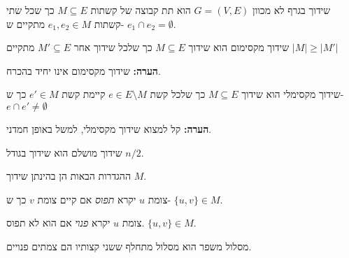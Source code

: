 \begin{definition}[שידוך]
שידוך בגרף לא מכוון
$G = (V, E)$
הוא תת קבוצה של קשתות 
$M \subseteq E$
כך שכל שתי קשתות
$e_1, e_2 \in M$
מתקיים ש-
$e_1 \cap e_2 = \emptyset$.
\end{definition}

\begin{definition}
שידוך מקסימום הוא שידוך 
$M \subseteq E$
כך שלכל שידוך אחר
$M' \subseteq E$
מתקיים
$|M| \geq |M'|$
\end{definition}

\textbf{הערה:}
שידוך מקסימום אינו יחיד בהכרח.

\begin{definition}
שידוך מקסימלי הוא שידוך 
$M \subseteq E$
כך שלכל קשת 
$e \in E \setminus M$
קיימת קשת 
$e' \in M$
כך ש-
$e \cap e' \neq \emptyset$
\end{definition}

\textbf{הערה:}
קל למצוא שידוך מקסימלי, למשל באופן חמדני.

\begin{definition}
שידוך מושלם הוא שידוך בגודל 
$n/2$.
\end{definition}

ההגדרות הבאות הן בהינתן שידוך $M$.
\begin{definition}
צומת $u$ יקרא
\emph{תפוס}
אם קיים צומת $v$ כך ש-
$\{u, v\} \in M$.
\end{definition}

\begin{definition}
צומת $u$ יקרא
\emph{פנוי}
אם הוא לא תפוס.
$\{u, v\} \in M$.
\end{definition}

\begin{definition}[מסלול מתחלף]
מסלול (פשוט) 
$(v_1, \ldots, v_l)$
יקרא
\emph{מתחלף}
אם לכל 
$1 \leq i < l$
מתקיים ש-
$|\{e_i, e_{i + 1}}\} \cap M| = 1$
כאשר
$e_i = \{v_i, v_{i + 1}\}$.
\end{definition}

\begin{definition}
מסלול משפר הוא מסלול מתחלף ששני קצותיו הם צמתים פנויים.
\end{definition}

\begin{figure}[h]
\centering

\end{figure}
